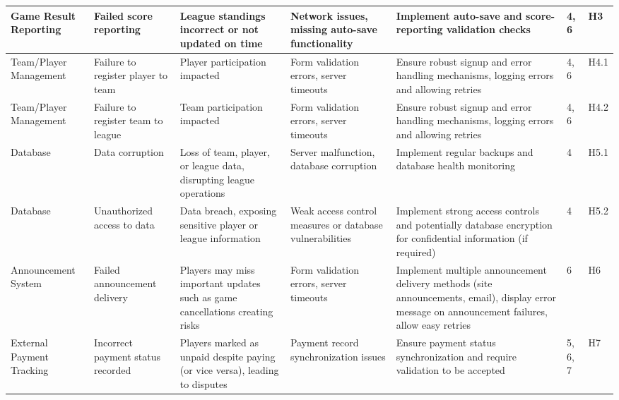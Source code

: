 \documentclass{article}
\begin{document}
\begin{landscape}
\begin{table}[hp]
\begin{footnotesize}
\begin{tabular}{|p{1in}|p{1in}|p{1in}|p{1.5in}|p{2.5in}|p{0.2in}|p{0.2in}|}
        \hline
        Game Result Reporting & Failed score reporting & League standings incorrect or not updated on time & Network issues, missing auto-save functionality & Implement auto-save and score-reporting validation checks & 4, 6 & H3 \\
        \hline
        Team/Player Management & Failure to register player to team & Player participation impacted & Form validation errors, server timeouts & Ensure robust signup and error handling mechanisms, logging errors and allowing retries & 4, 6 & H4.1 \\
        \hline
        Team/Player Management & Failure to register team to league & Team participation impacted & Form validation errors, server timeouts & Ensure robust signup and error handling mechanisms, logging errors and allowing retries & 4, 6 & H4.2 \\
        \hline
        Database & Data corruption & Loss of team, player, or league data, disrupting league operations & Server malfunction, database corruption & Implement regular backups and database health monitoring & 4 & H5.1 \\
        \hline

        Database & Unauthorized access to data & Data breach, exposing sensitive player or league information & Weak access control measures or database vulnerabilities  & Implement strong access controls and potentially database encryption for confidential information (if required) & 4 & H5.2 \\
        \hline

        Announcement System & Failed announcement delivery & Players may miss important updates such as game cancellations creating risks & Form validation errors, server timeouts & Implement multiple announcement delivery methods (site announcements, email), display error message on announcement failures, allow easy retries  & 6 & H6 \\
        \hline
      
        External Payment Tracking & Incorrect payment status recorded & Players marked as unpaid despite paying (or vice versa), leading to disputes & Payment record synchronization issues & Ensure payment status synchronization and require validation to be accepted & 5, 6, 7& H7 \\

        \hline
        \bottomrule
    \end{tabular}
    \end{footnotesize}
\end{table}
\end{landscape}
\restoregeometry
\end{document}
